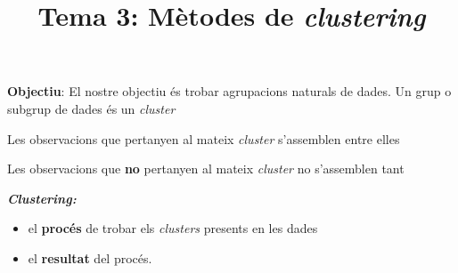 \documentclass[a4paper]{article}
\title{Tema 3: Mètodes de \emph{clustering}}
\begin{document}
	
\maketitle

\textbf{Objectiu}: El nostre objectiu és trobar agrupacions naturals de dades. Un grup o subgrup de dades és un \emph{cluster}

Les observacions que pertanyen al mateix \emph{cluster} s'assemblen entre elles

Les observacions que \textbf{no} pertanyen al mateix \emph{cluster} no s'assemblen tant

\textbf{\emph{Clustering:}}
\begin{itemize}
	\item el \textbf{procés} de trobar els \emph{clusters} presents en les dades
	\item el \textbf{resultat} del procés.
\end{itemize}
\end{document}
